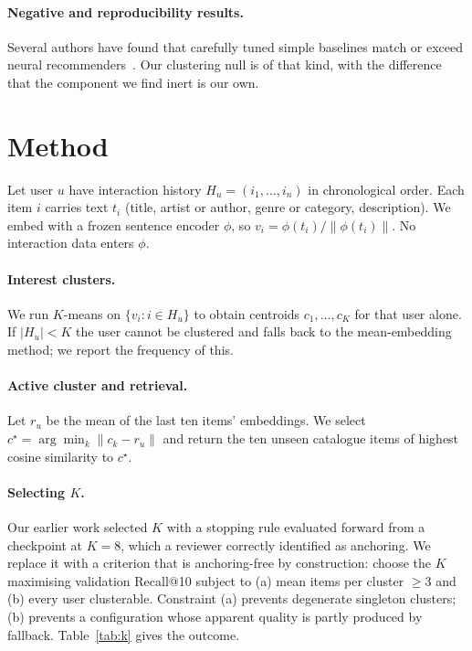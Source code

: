 \documentclass[runningheads,a4paper]{llncs}
\begin{document}
\paragraph{Negative and reproducibility results.} Several authors have found that carefully
tuned simple baselines match or exceed neural
recommenders~\cite{dacrema2019really,rendle2020neural}. Our clustering null is of that kind,
with the difference that the component we find inert is our own.

\section{Method}

Let user $u$ have interaction history $H_u = (i_1,\dots,i_n)$ in chronological order. Each
item $i$ carries text $t_i$ (title, artist or author, genre or category, description). We
embed with a frozen sentence encoder $\phi$, so $v_i = \phi(t_i)/\lVert\phi(t_i)\rVert$.
No interaction data enters $\phi$.

\paragraph{Interest clusters.} We run $K$-means on $\{v_i : i \in H_u\}$ to obtain
centroids $c_1,\dots,c_K$ for that user alone. If $|H_u| < K$ the user cannot be clustered
and falls back to the mean-embedding method; we report the frequency of this.

\paragraph{Active cluster and retrieval.} Let $r_u$ be the mean of the last ten items'
embeddings. We select $c^\star = \arg\min_k \lVert c_k - r_u \rVert$ and return the ten
unseen catalogue items of highest cosine similarity to $c^\star$.

\paragraph{Selecting $K$.} Our earlier work selected $K$ with a stopping rule evaluated
forward from a checkpoint at $K=8$, which a reviewer correctly identified as anchoring.
We replace it with a criterion that is anchoring-free by construction: choose the $K$
maximising validation Recall@10 subject to (a) mean items per cluster $\geq 3$ and
(b) every user clusterable. Constraint (a) prevents degenerate singleton clusters;
(b) prevents a configuration whose apparent quality is partly produced by fallback.
Table~\ref{tab:k} gives the outcome.
\end{document}
